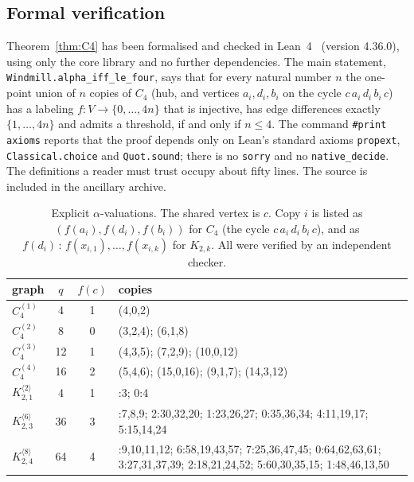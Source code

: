 \documentclass[11pt]{amsart}
\theoremstyle{definition}
\theoremstyle{remark}
\begin{document}
\subsection{Formal verification}\label{sec:lean}
Theorem~\ref{thm:C4} has been formalised and checked in Lean~4~\cite{lean4} (version 4.36.0), using only the core library and no further dependencies. The main statement, \texttt{Windmill.alpha\_iff\_le\_four}, says that for every natural number $n$ the one-point union of $n$ copies of $C_4$ (hub, and vertices $a_i, d_i, b_i$ on the cycle $c\,a_i\,d_i\,b_i\,c$) has a labeling $f\colon V \to \{0,\dots,4n\}$ that is injective, has edge differences exactly $\{1,\dots,4n\}$ and admits a threshold, if and only if $n \le 4$. The command \texttt{\#print axioms} reports that the proof depends only on Lean's standard axioms \texttt{propext}, \texttt{Classical.choice} and \texttt{Quot.sound}; there is no \texttt{sorry} and no \texttt{native\_decide}. The definitions a reader must trust occupy about fifty lines. The source is included in the ancillary archive.

\begin{table}[ht]
\caption{Explicit $\alpha$-valuations. The shared vertex is $c$. Copy $i$ is listed as $(f(a_i), f(d_i), f(b_i))$ for $C_4$ (the cycle $c\,a_i\,d_i\,b_i\,c$), and as $f(d_i)\,{:}\,f(x_{i,1}),\dots,f(x_{i,k})$ for $K_{2,k}$. All were verified by an independent checker.}\label{tab:labelings}
\centering\small
\begin{tabular}{@{}lcc>{\raggedright\arraybackslash}p{}@{}}
\toprule
graph & $q$ & $f(c)$ & copies \\
\midrule
$C_{4}^{(1)}$ & 4 & 1 & (4,0,2) \\
$C_{4}^{(2)}$ & 8 & 0 & (3,2,4); (6,1,8) \\
$C_{4}^{(3)}$ & 12 & 1 & (4,3,5); (7,2,9); (10,0,12) \\
$C_{4}^{(4)}$ & 16 & 2 & (5,4,6); (15,0,16); (9,1,7); (14,3,12) \\
$K_{2,1}^{\langle 2\rangle}$ & 4 & 1 & 2:3; 0:4 \\
$K_{2,3}^{\langle 6\rangle}$ & 36 & 3 & 6:7,8,9; 2:30,32,20; 1:23,26,27; 0:35,36,34; 4:11,19,17; 5:15,14,24 \\
$K_{2,4}^{\langle 8\rangle}$ & 64 & 4 & 8:9,10,11,12; 6:58,19,43,57; 7:25,36,47,45; 0:64,62,63,61; 3:27,31,37,39; 2:18,21,24,52; 5:60,30,35,15; 1:48,46,13,50 \\
\bottomrule
\end{tabular}
\end{table}
\end{document}
